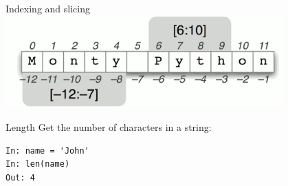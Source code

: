 \documentclass[aspectratio=169,usenames,dvipsnames]{beamer}
\begin{document}
\begin{frame}{Indexing and slicing}
    \includegraphics[width=0.8\textwidth]{fig/slices}
\end{frame}

\begin{frame}[fragile]{Length}
Get the number of characters in a string:
\begin{lstlisting}
In: name = 'John'
In: len(name)
Out: 4
\end{lstlisting}
\end{frame}

%
%
%
\end{document}
